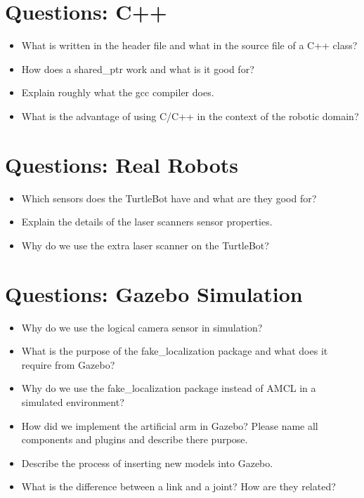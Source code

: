 \section{Questions: C++}
\label{sec:questions_c++}

\begin{itemize}
 \item What is written in the header file and what in the source file of a C++ class?
 \item How does a shared\_ptr work and what is it good for?
 \item Explain roughly what the gcc compiler does.
 \item What is the advantage of using C/C++ in the context of the robotic domain?
\end{itemize}

\section{Questions: Real Robots}
\label{sec:questions_robots}

\begin{itemize}
 \item Which sensors does the TurtleBot have and what are they good for?
 \item Explain the details of the laser scanners sensor properties.
 \item Why do we use the extra laser scanner on the TurtleBot?
\end{itemize}

\section{Questions: Gazebo Simulation}
\label{sec:questions_simulation}

\begin{itemize}
 \item Why do we use the logical camera sensor in simulation?
 \item What is the purpose of the fake\_localization package and what does it require from Gazebo?
 \item Why do we use the fake\_localization package instead of AMCL in a simulated environment?
 \item How did we implement the artificial arm in Gazebo? Please name all components and plugins and describe there purpose.
 \item Describe the process of inserting new models into Gazebo.
 \item What is the difference between a link and a joint? How are they related?
\end{itemize}

